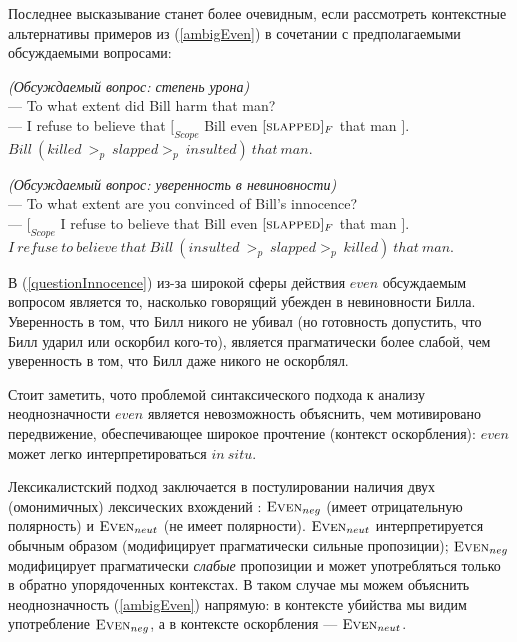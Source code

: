 \documentclass[a4paper, titlepage]{article}
\begin{document}
\medskip

Последнее высказывание станет более очевидным, если рассмотреть контекстные альтернативы примеров из (\ref{ambigEven}) в сочетании с предполагаемыми обсуждаемыми вопросами:

\begin{exe}
    \ex \label{questionHarm} \textit{(Обсуждаемый вопрос: степень урона)} \\
        --- To what extent did Bill harm that man? \\
        --- I refuse to believe that $ [_{Scope}$ Bill even $ [\textsc{slapped}]_F $ that man $ ] $. \\
        $ Bill\ (killed\ >_{p}\ slapped >_{p}\ insulted)\ that\ man. $
\end{exe}

\begin{exe}
    \ex \label{questionInnocence} \textit{(Обсуждаемый вопрос: уверенность в невиновности)} \\
    --- To what extent are you convinced of Bill’s innocence? \\
    --- $ [_{Scope}$ I refuse to believe that Bill even $ [\textsc{slapped}]_F $ that man $ ] $. \\
         $ I\ re\!f\!use\ to\ believe\ that\ Bill\ (insulted\ >_{p}\ slapped >_{p}\ killed)\ that\ man. $
\end{exe}

В (\ref{questionInnocence}) из-за широкой сферы действия $ even $ обсуждаемым вопросом является то, насколько говорящий убежден в невиновности Билла. Уверенность в том, что Билл никого не убивал (но готовность допустить, что Билл ударил или оскорбил кого-то), является прагматически более слабой, чем уверенность в том, что Билл даже никого не оскорблял.

\medskip

Стоит заметить, чото проблемой синтаксического подхода к анализу неоднозначности $ even $ является невозможность объяснить, чем мотивировано передвижение, обеспечивающее широкое прочтение (контекст оскорбления): $ even $ может легко интерпретироваться $ in\ situ $.

\medskip

Лексикалистский подход заключается в постулировании наличия двух (омонимичных) лексических вхождений \citep{rooth1985association,giannakidou2007landscape}: $ \textsc{Even}_{neg} $ (имеет отрицательную полярность) и $ \textsc{Even}_{neut} $ (не имеет полярности). $ \textsc{Even}_{neut} $ интерпретируется обычным образом (модифицирует прагматически сильные пропозиции); $ \textsc{Even}_{neg} $ модифицирует прагматически \textit{слабые} пропозиции и может употребляться только в обратно упорядоченных контекстах. В таком случае мы можем объяснить неоднозначность (\ref{ambigEven}) напрямую: в контексте убийства мы видим употребление $ \textsc{Even}_{neg} $, а в контексте оскорбления ---  $ \textsc{Even}_{neut} $.
\end{document}
